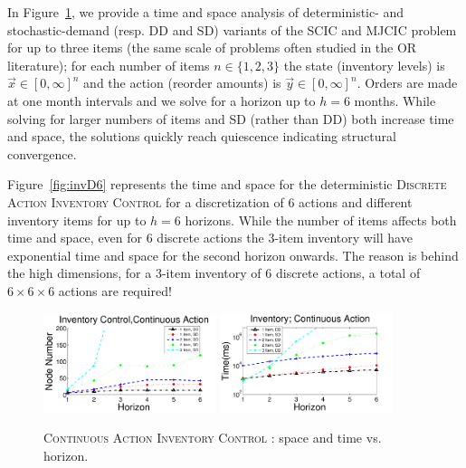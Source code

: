 \documentclass[twoside,11pt]{article}
\newcommand{\InventoryControl}{\textsc{Inventory Control }}
\begin{document}
In Figure~\ref{fig:invC}, we provide a time and space analysis of
deterministic- and stochastic-demand (resp. DD and SD) variants of the
SCIC and MJCIC problem for up to three items (the same scale of
problems often studied in the OR literature); for each number of items
$n \in \{ 1,2,3 \}$ the state (inventory levels) is $\vec{x} \in
[0,\infty]^n$ and the action (reorder amounts) is $\vec{y} \in
[0,\infty]^n$.  Orders are made at one month intervals and we solve
for a horizon up to $h=6$ months.  
While solving for larger numbers of
items and SD (rather than DD) both increase time and space, 
the solutions quickly reach quiescence indicating structural
convergence.

Figure~\ref{fig:invD6} represents the time and space for the deterministic \textsc{Discrete Action} \InventoryControl for a discretization of 6 actions and different inventory items for up to $h=6$ horizons. While the number of items affects both time and space, even for 6 discrete actions the 3-item inventory will have exponential time and space for the second horizon onwards. The reason is behind the high dimensions, for a 3-item inventory of 6 discrete actions, a total of $6 \times 6 \times 6$ actions are required!
\begin{figure}[tbp!]
\vspace{-2mm}
\centering
\includegraphics[width=0.45\textwidth]{pics/invCNode.pdf}
\hspace{2mm}
\includegraphics[width=0.45\textwidth]{pics/invCTime.pdf}
\vspace{-2mm}
\caption{%
\textsc{Continuous Action} \InventoryControl: space and time vs. horizon.
}
\label{fig:invC}
\vspace{-2mm}
\end{figure}
\end{document}
